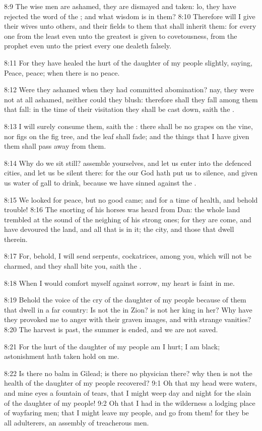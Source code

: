 8:9 The wise men are ashamed, they are dismayed and taken: lo, they have rejected the word of the \LORD; and what wisdom is in them?  8:10 Therefore will I give their wives unto others, and their fields to them that shall inherit them: for every one from the least even unto the greatest is given to covetousness, from the prophet even unto the priest every one dealeth falsely.

8:11 For they have healed the hurt of the daughter of my people slightly, saying, Peace, peace; when there is no peace.

8:12 Were they ashamed when they had committed abomination? nay, they were not at all ashamed, neither could they blush: therefore shall they fall among them that fall: in the time of their visitation they shall be cast down, saith the \LORD.

8:13 I will surely consume them, saith the \LORD: there shall be no grapes on the vine, nor figs on the fig tree, and the leaf shall fade; and the things that I have given them shall pass away from them.

8:14 Why do we sit still? assemble yourselves, and let us enter into the defenced cities, and let us be silent there: for the \LORD our God hath put us to silence, and given us water of gall to drink, because we have sinned against the \LORD.

8:15 We looked for peace, but no good came; and for a time of health, and behold trouble!  8:16 The snorting of his horses was heard from Dan: the whole land trembled at the sound of the neighing of his strong ones; for they are come, and have devoured the land, and all that is in it; the city, and those that dwell therein.

8:17 For, behold, I will send serpents, cockatrices, among you, which will not be charmed, and they shall bite you, saith the \LORD.

8:18 When I would comfort myself against sorrow, my heart is faint in me.

8:19 Behold the voice of the cry of the daughter of my people because of them that dwell in a far country: Is not the \LORD in Zion? is not her king in her? Why have they provoked me to anger with their graven images, and with strange vanities?  8:20 The harvest is past, the summer is ended, and we are not saved.

8:21 For the hurt of the daughter of my people am I hurt; I am black; astonishment hath taken hold on me.

8:22 Is there no balm in Gilead; is there no physician there? why then is not the health of the daughter of my people recovered?  9:1 Oh that my head were waters, and mine eyes a fountain of tears, that I might weep day and night for the slain of the daughter of my people!  9:2 Oh that I had in the wilderness a lodging place of wayfaring men; that I might leave my people, and go from them! for they be all adulterers, an assembly of treacherous men.

